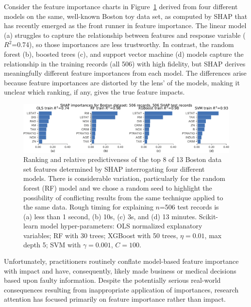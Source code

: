 \documentclass[11pt]{article}
\newcommand{\figref}[1]{Figure~\ref{#1}}
\begin{document}
Consider the feature importance charts in \figref{fig:diff-models} derived from four different models on the same, well-known Boston toy data set, as computed by SHAP that has recently emerged as the front runner in feature importance. The linear model (a) struggles to capture the relationship between features and response variable ($R^2$=0.74), so those importances are less trustworthy.  In contrast, the random forest (b), boosted trees (c), and support vector machine (d) models capture the relationship in the training records (all 506) with high fidelity, but SHAP derives meaningfully different feature importances from each model. The differences arise because feature importances are distorted by the lens' of the models, making it unclear which ranking, if any, gives the true feature impacts. 

\begin{figure}[htbp]
\begin{center}
\includegraphics[scale=0.6]{images/diff-models.pdf}
\caption{\small Ranking and relative predictiveness of the top 8 of 13 Boston data set features determined by SHAP interrogating four different models.  There is considerable variation, particularly for the random forest (RF) model and we chose a random seed to highlight the possibility of conflicting results from the same technique applied to the same data. Rough timing for explaining $n$=506 test records is (a) less than 1 second, (b) 10s, (c) 3s, and (d) 13 minutes.  Scikit-learn model hyper-parameters: OLS normalized explanatory variables; RF with 30 trees; XGBoost with 50 trees, $\eta=0.01$, max depth 5; SVM with $\gamma=0.001$, $C=100$.}
\label{fig:diff-models}
\end{center}
\end{figure}

Unfortunately, practitioners routinely conflate model-based feature importance with impact and have, consequently, likely made business or medical decisions based upon faulty information. Despite the potentially serious real-world consequences resulting from inappropriate application of importances, research attention has focused primarily on feature importance rather than impact. 
\end{document}
